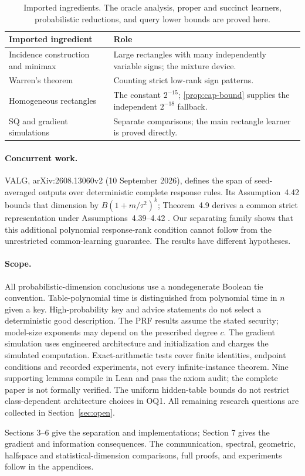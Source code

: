 \begin{table}[H]\small\centering
\begin{tabularx}{\linewidth}{@{}p{.34\linewidth}X@{}}\toprule
Imported ingredient & Role\\\midrule
Incidence construction and minimax \citep{HHPTZ22} & Large rectangles with many independently variable signs; the mixture device.\\
Warren's theorem \citep{Warren68,AMY16} & Counting strict low-rank sign patterns.\\
Homogeneous rectangles \citep{APP05,HHPTZ22} & The constant $2^{-15}$; \cref{prop:cap-bound} supplies the independent $2^{-18}$ fallback.\\
SQ and gradient simulations \citep{Feldman17,AKMSS21} & Separate comparisons; the main rectangle learner is proved directly.\\\bottomrule
\end{tabularx}
\caption{Imported ingredients. The oracle analysis, proper and succinct learners, probabilistic reductions, and query lower bounds are proved here.}
\end{table}

\paragraph{Concurrent work.}
VALG, arXiv:2608.13060v2 (10 September 2026), defines the span of seed-averaged outputs over deterministic complete response rules. Its Assumption~4.42 bounds that dimension by $B(1+m/\tau^2)^k$; Theorem~4.9 derives a common strict representation under Assumptions~4.39--4.42 \citep{VALG26}. Our separating family shows that this additional polynomial response-rank condition cannot follow from the unrestricted common-learning guarantee. The results have different hypotheses.

\paragraph{Scope.}
All probabilistic-dimension conclusions use a nondegenerate Boolean tie convention. Table-polynomial time is distinguished from polynomial time in $n$ given a key. High-probability key and advice statements do not select a deterministic good description. The PRF results assume the stated security; model-size exponents may depend on the prescribed degree $c$. The gradient simulation uses engineered architecture and initialization and charges the simulated computation. Exact-arithmetic tests cover finite identities, endpoint conditions and recorded experiments, not every infinite-instance theorem. Nine supporting lemmas compile in Lean and pass the axiom audit; the complete paper is not formally verified. The uniform hidden-table bounds do not restrict class-dependent architecture choices in OQ1. All remaining research questions are collected in Section~\ref{sec:open}.

Sections 3--6 give the separation and implementations; Section 7 gives the gradient and information consequences. The communication, spectral, geometric, halfspace and statistical-dimension comparisons, full proofs, and experiments follow in the appendices.
